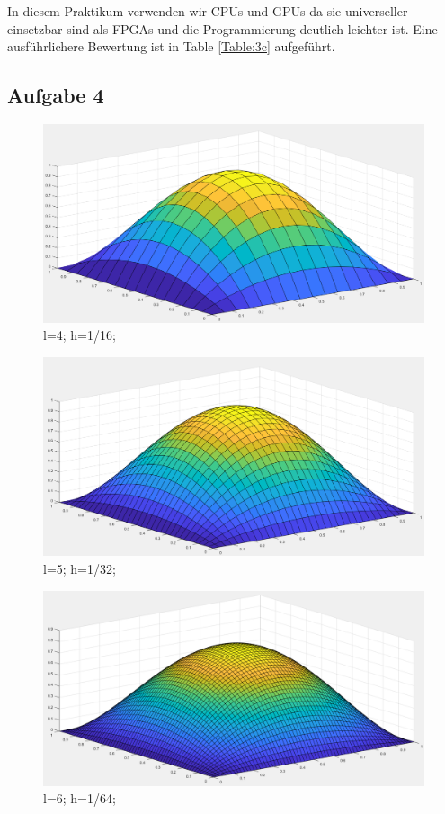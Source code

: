 \documentclass{report}
\begin{document}
    In diesem Praktikum verwenden wir CPUs und GPUs da sie universeller einsetzbar sind als FPGAs und die Programmierung deutlich leichter ist. Eine ausführlichere Bewertung ist in Table \ref{Table:3c} aufgeführt.


    \subsection{Aufgabe 4}
	\begin{figure}
		\includegraphics[width=\linewidth]{Aufgaben-Ressourcen/A4L4.png}
		\caption{l=4; h=1/16;}
		\label{A4L4}
	\end{figure}
\begin{figure}
		\includegraphics[width=\linewidth]{Aufgaben-Ressourcen/A4L5.png} 
		\caption{l=5; h=1/32;}
		\label{A4L5}
	\end{figure}
	\begin{figure}
		\includegraphics[width=\linewidth]{Aufgaben-Ressourcen/A4L6.png} 
		\caption{l=6; h=1/64;}
		\label{A4L6}
	\end{figure}
\end{document}
